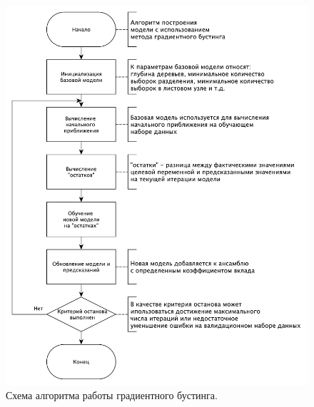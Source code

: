 \begin{figure}[H]
	\centering
	\includegraphics[width=\textwidth]{inc/schemeGradient.pdf}
	\caption{ Схема алгоритма работы градиентного бустинга. }
	\label{img:schemeGradient}
\end{figure}

